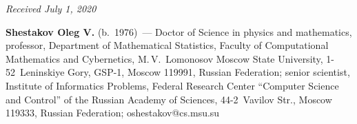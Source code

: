 \vspace*{-9pt}

\hfill{\small\textit{Received July 1, 2020}}


\vspace*{-28pt}

\Contrl

\vspace*{-6pt}

\noindent
\textbf{Shestakov Oleg V.} (b.\ 1976)~--- 
Doctor of Science in physics and mathematics, professor, 
Department of Mathematical Statistics, Faculty of Computational 
Mathematics and Cybernetics, M.\,V.~Lomonosov Moscow State University, 
1-52~Leninskiye Gory, GSP-1, Moscow 119991, Russian Federation; 
senior scientist, Institute of Informatics Problems, 
Federal Research Center ``Computer Science and Control'' 
of the Russian Academy of Sciences, 44-2~Vavilov Str., Moscow 119333, 
Russian Federation; \mbox{oshestakov@cs.msu.su}
\label{end\stat}

\renewcommand{\bibname}{\protect\rm Литература} 